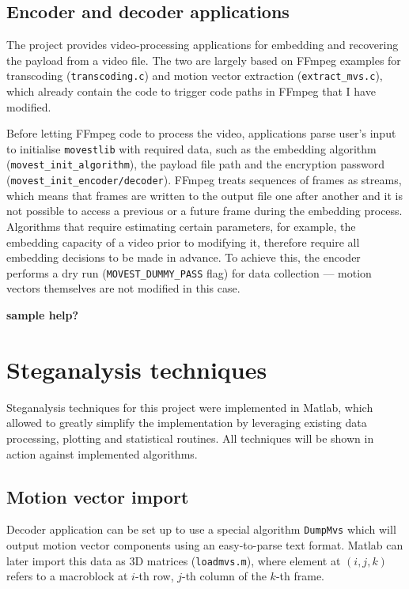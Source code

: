 \documentclass[12pt,british,twoside,notitlepage,usenames,dvipsnames,hypens,final]{report}
\numberwithin{equation}{section}
\numberwithin{figure}{section}
\begin{document}
\subsection{Encoder and decoder applications}
\label{enc-dec-bin}
The project provides video-processing applications for embedding and recovering the payload from a video file. The two are largely based on FFmpeg examples for transcoding (\texttt{transcoding.c}) and motion vector extraction (\texttt{extract\_mvs.c}), which already contain the code to trigger code paths in FFmpeg that I have modified.

Before letting FFmpeg code to process the video, applications parse user's input to initialise \texttt{movestlib} with required data, such as the embedding algorithm (\texttt{movest\_init\_algorithm}), the payload file path and the encryption password (\texttt{movest\_init\_encoder/decoder}). FFmpeg treats sequences of frames as streams, which means that frames are written to the output file one after another and it is not possible to access a previous or a future frame during the embedding process. Algorithms that require estimating certain parameters, for example, the embedding capacity of a video prior to modifying it, therefore require all embedding decisions to be made in advance. To achieve this, the encoder performs a dry run (\texttt{MOVEST\_DUMMY\_PASS} flag) for data collection --- motion vectors themselves are not modified in this case.

\textbf{sample help?}

\section{Steganalysis techniques}

Steganalysis techniques for this project were implemented in Matlab, which allowed to greatly simplify the implementation by leveraging existing data processing, plotting and statistical routines. All techniques will be shown in action against implemented algorithms.

\subsection{Motion vector import}

Decoder application can be set up to use a special algorithm \texttt{DumpMvs} which will output motion vector components using an easy-to-parse text format. Matlab can later import this data as 3D matrices (\texttt{loadmvs.m}), where element at $(i, j, k)$ refers to a macroblock at $i$-th row, $j$-th column of the $k$-th frame. 
\end{document}
